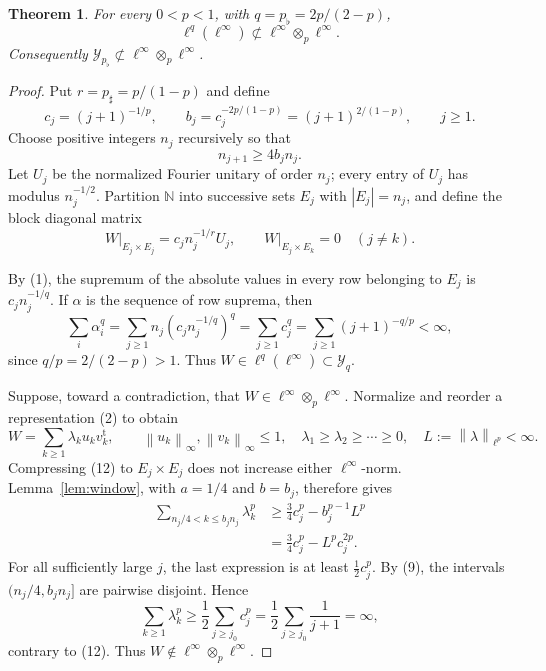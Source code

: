 \documentclass[11pt]{article}
\newtheorem{theorem}{Theorem}
\theoremstyle{remark}
\newcommand{\linf}{\ell^\infty}
\newcommand{\tp}{\linf\otimes_p\linf}
\newcommand{\norm}[1]{\left\lVert#1\right\rVert}
\begin{document}
\begin{theorem}
\label{thm:main}
For every \(0<p<1\), with \(q=p_\flat=2p/(2-p)\),
\[
 \ell^q(\linf)\not\subset\tp.
\]
Consequently \(\mathcal Y_{p_\flat}\not\subset\tp\).
\end{theorem}

\begin{proof}
Put \(r=p_\sharp=p/(1-p)\) and define
\[
 c_j=(j+1)^{-1/p},\qquad
 b_j=c_j^{-2p/(1-p)}=(j+1)^{2/(1-p)},\qquad j\ge1.           \tag{8}
\]
Choose positive integers \(n_j\) recursively so that
\[
 n_{j+1}\ge4b_jn_j.                                         \tag{9}
\]
Let \(U_j\) be the normalized Fourier unitary of order \(n_j\); every entry
of \(U_j\) has modulus \(n_j^{-1/2}\). Partition \(\mathbb N\) into
successive sets \(E_j\) with \(|E_j|=n_j\), and define the block diagonal
matrix
\[
 W\big|_{E_j\times E_j}=c_jn_j^{-1/r}U_j,\qquad
 W\big|_{E_j\times E_k}=0\quad(j\ne k).                    \tag{10}
\]

By (1), the supremum of the absolute values in every row belonging to
\(E_j\) is \(c_jn_j^{-1/q}\). If \(\alpha\) is the sequence of row suprema,
then
\[
 \sum_i\alpha_i^q
 =\sum_{j\ge1}n_j(c_jn_j^{-1/q})^q
 =\sum_{j\ge1}c_j^q
 =\sum_{j\ge1}(j+1)^{-q/p}<\infty,                           \tag{11}
\]
since \(q/p=2/(2-p)>1\). Thus
\(W\in\ell^q(\linf)\subset\mathcal Y_q\).

Suppose, toward a contradiction, that \(W\in\tp\). Normalize and reorder a
representation (2) to obtain
\[
 W=\sum_{k\ge1}\lambda_k u_kv_k^{\mathrm t},\qquad
 \norm{u_k}_\infty,\norm{v_k}_\infty\le1,\quad
 \lambda_1\ge\lambda_2\ge\cdots\ge0,\quad
 L:=\norm\lambda_{\ell^p}<\infty.                           \tag{12}
\]
Compressing (12) to \(E_j\times E_j\) does not increase either
\(\ell^\infty\)-norm. Lemma~\ref{lem:window}, with \(a=1/4\) and \(b=b_j\),
therefore gives
\begin{align*}
 \sum_{n_j/4<k\le b_jn_j}\lambda_k^p
 &\ge\frac34c_j^p-b_j^{p-1}L^p\\
 &=\frac34c_j^p-L^pc_j^{2p}.                                \tag{13}
\end{align*}
For all sufficiently large \(j\), the last expression is at least
\(\tfrac12c_j^p\). By (9), the intervals
\((n_j/4,b_jn_j]\) are pairwise disjoint. Hence
\[
 \sum_{k\ge1}\lambda_k^p
 \ge\frac12\sum_{j\ge j_0}c_j^p
 =\frac12\sum_{j\ge j_0}\frac1{j+1}=\infty,               \tag{14}
\]
contrary to (12). Thus \(W\notin\tp\).
\end{proof}
\end{document}
